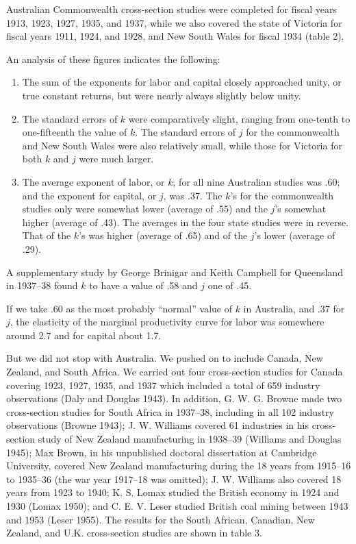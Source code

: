 \documentclass{article}
\begin{document}
Australian Commonwealth cross-section studies were completed for fiscal years 1913, 1923, 1927, 1935, and 1937, while we also covered the state of Victoria for fiscal years 1911, 1924, and 1928, and New South Wales for fiscal 1934 (table 2).

An analysis of these figures indicates the following:
\begin{enumerate}[{1.}]
\item The sum of the exponents for labor and capital closely approached unity, or true constant returns, but were nearly always slightly below unity.
\item The standard errors of \(k\) were comparatively slight, ranging from one-tenth to one-fifteenth the value of \(k\). The standard errors of \(j\) for the commonwealth and New South Wales were also relatively small, while those for Victoria for both \(k\) and \(j\) were much larger.
\item The average exponent of labor, or \(k\), for all nine Australian studies was .60; and the exponent for capital, or \(j\), was .37. The \(k\)'s for the commonwealth studies only were somewhat lower (average of .55) and the \(j\)'s somewhat higher (average of .43). The averages in the four state studies were in reverse. That of the \(k\)'s was higher (average of .65) and of the \(j\)'s lower (average of .29).
\end{enumerate}

A supplementary study by George Brinigar and Keith Campbell for Queensland in 1937--38 found \(k\) to have a value of .58 and \(j\) one of .45.

If we take .60 as the most probably ``normal'' value of \(k\) in Australia, %
and .37 for \(j\), the elasticity of the marginal productivity curve for labor was somewhere around 2.7 and for capital about 1.7.

But we did not stop with Australia. We pushed on to include Canada, New Zealand, and South Africa. We carried out four cross-section studies for Canada covering 1923, 1927, 1935, and 1937 which included a total of 659 industry observations (Daly and Douglas 1943). In addition, G. W. G. Browne made two cross-section studies for South Africa in 1937--38, including in all 102 industry observations (Browne 1943); J. W. Williams covered 61 industries in his cross-section study of New Zealand manufacturing in 1938--39 (Williams and Douglas 1945); Max Brown, in his unpublished doctoral dissertation at Cambridge University, covered New Zealand manufacturing during the 18 years from 1915--16 to 1935--36 (the war year 1917--18 was omitted); J. W. Williams also covered 18 years from 1923 to 1940; K. S. Lomax studied the British economy in 1924 and 1930 (Lomax 1950); and C. E. V. Leser studied British coal mining between 1943 and 1953 (Leser 1955). The results for the South African, Canadian, New Zealand, and U.K. cross-section studies are shown in table 3.
\end{document}
